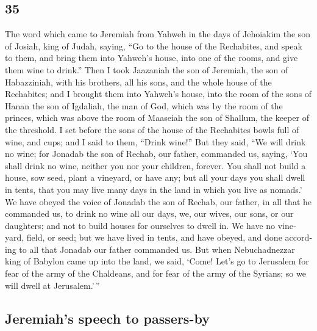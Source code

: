 \begin{paracol}{2}
\begin{otherlanguage}{english}
\hypertarget{section-69}{%
\section{35}\label{section-69}}

 The word which came to Jeremiah from Yahweh in the days
of Jehoiakim the son of Josiah, king of Judah, saying, 
``Go to the house of the Rechabites, and speak to them, and bring them
into Yahweh's house, into one of the rooms, and give them wine to
drink.''  Then I took Jaazaniah the son of Jeremiah, the
son of Habazziniah, with his brothers, all his sons, and the whole house
of the Rechabites;  and I brought them into Yahweh's
house, into the room of the sons of Hanan the son of Igdaliah, the man
of God, which was by the room of the princes, which was above the room
of Maaseiah the son of Shallum, the keeper of the threshold.
 I set before the sons of the house of the Rechabites
bowls full of wine, and cups; and I said to them, ``Drink wine!''
 But they said, ``We will drink no wine; for Jonadab the
son of Rechab, our father, commanded us, saying, `You shall drink no
wine, neither you nor your children, forever.  You shall
not build a house, sow seed, plant a vineyard, or have any; but all your
days you shall dwell in tents, that you may live many days in the land
in which you live as nomads.'  We have obeyed the voice of
Jonadab the son of Rechab, our father, in all that he commanded us, to
drink no wine all our days, we, our wives, our sons, or our daughters;
 and not to build houses for ourselves to dwell in. We
have no vineyard, field, or seed;  but we have lived in
tents, and have obeyed, and done according to all that Jonadab our
father commanded us.  But when Nebuchadnezzar king of
Babylon came up into the land, we said, `Come! Let's go to Jerusalem for
fear of the army of the Chaldeans, and for fear of the army of the
Syrians; so we will dwell at Jerusalem.'\,''

\hypertarget{jeremiahs-speech-to-passers-by}{%
\subsection{Jeremiah's speech to
passers-by}\label{jeremiahs-speech-to-passers-by}}


\end{otherlanguage}
\end{paracol}
